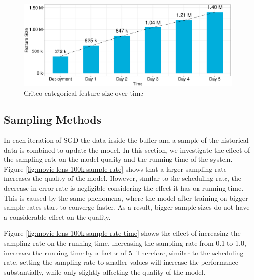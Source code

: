 \begin{figure}[H]
\includegraphics[width=\columnwidth]{../images/experiment-results/feature-discovery-experiment.eps}
\caption{Criteo categorical feature size over time}
\label{fig:criteo-feature-discovery}
\end{figure}

\subsection{Sampling Methods}
In each iteration of SGD the data inside the buffer and a sample of the historical data is combined to update the model.
In this section, we investigate the effect of the sampling rate on the model quality and the running time of the system.
Figure \ref{fig:movie-lens-100k-sample-rate} shows that a larger sampling rate increases the quality of the model.
However, similar to the scheduling rate, the decrease in error rate is negligible considering the effect it has on running time. 
This is caused by the same phenomena, where the model after training on bigger sample rates start to converge faster.
As a result, bigger sample sizes do not have a considerable effect on the quality.
 
Figure \ref{fig:movie-lens-100k-sample-rate-time} shows the effect of increasing the sampling rate on the running time.
Increasing the sampling rate from 0.1 to 1.0, increases the running time by a factor of 5.
Therefore, similar to the scheduling rate, setting the sampling rate to smaller values will increase the performance substantially, while only slightly affecting the quality of the model.

